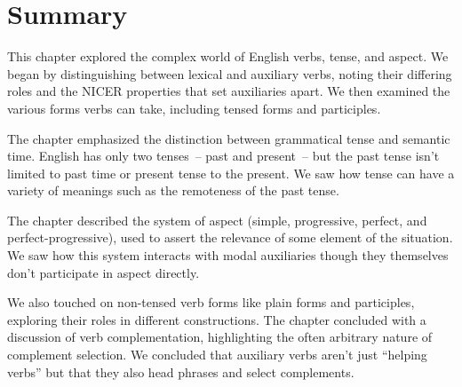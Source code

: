 \section{Summary}

This chapter explored the complex world of English verbs, tense, and aspect. We began by distinguishing between lexical and auxiliary verbs, noting their differing roles and the NICER properties that set auxiliaries apart. We then examined the various forms verbs can take, including tensed forms and participles.

The chapter emphasized the distinction between grammatical tense and semantic time. English has only two tenses~-- past and present~-- but the past tense isn't limited to past time or present tense to the present. We saw how tense can have a variety of meanings such as the remoteness of the past tense. 

The chapter described the system of aspect (simple, progressive, perfect, and perfect-progressive), used to assert the relevance of some element of the situation. We saw how this system interacts with modal auxiliaries though they themselves don't participate in aspect directly.

We also touched on non-tensed verb forms like plain forms and participles, exploring their roles in different constructions. The chapter concluded with a discussion of verb complementation, highlighting the often arbitrary nature of complement selection. We concluded that auxiliary verbs aren't just ``helping verbs'' but that they also head phrases and select complements.